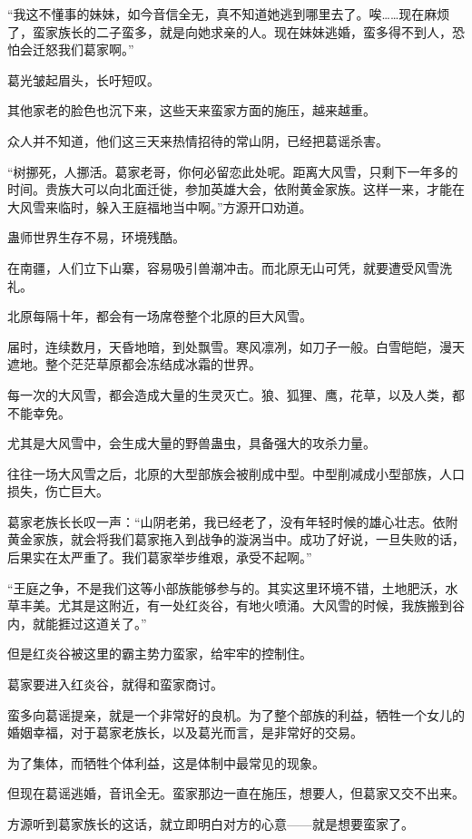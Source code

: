 \begin{this_body}
“我这不懂事的妹妹，如今音信全无，真不知道她逃到哪里去了。唉……现在麻烦了，蛮家族长的二子蛮多，就是向她求亲的人。现在妹妹逃婚，蛮多得不到人，恐怕会迁怒我们葛家啊。”

葛光皱起眉头，长吁短叹。

其他家老的脸色也沉下来，这些天来蛮家方面的施压，越来越重。

众人并不知道，他们这三天来热情招待的常山阴，已经把葛谣杀害。

“树挪死，人挪活。葛家老哥，你何必留恋此处呢。距离大风雪，只剩下一年多的时间。贵族大可以向北面迁徙，参加英雄大会，依附黄金家族。这样一来，才能在大风雪来临时，躲入王庭福地当中啊。”方源开口劝道。

蛊师世界生存不易，环境残酷。

在南疆，人们立下山寨，容易吸引兽潮冲击。而北原无山可凭，就要遭受风雪洗礼。

北原每隔十年，都会有一场席卷整个北原的巨大风雪。

届时，连续数月，天昏地暗，到处飘雪。寒风凛冽，如刀子一般。白雪皑皑，漫天遮地。整个茫茫草原都会冻结成冰霜的世界。

每一次的大风雪，都会造成大量的生灵灭亡。狼、狐狸、鹰，花草，以及人类，都不能幸免。

尤其是大风雪中，会生成大量的野兽蛊虫，具备强大的攻杀力量。

往往一场大风雪之后，北原的大型部族会被削成中型。中型削减成小型部族，人口损失，伤亡巨大。

葛家老族长长叹一声：“山阴老弟，我已经老了，没有年轻时候的雄心壮志。依附黄金家族，就会将我们葛家拖入到战争的漩涡当中。成功了好说，一旦失败的话，后果实在太严重了。我们葛家举步维艰，承受不起啊。”

“王庭之争，不是我们这等小部族能够参与的。其实这里环境不错，土地肥沃，水草丰美。尤其是这附近，有一处红炎谷，有地火喷涌。大风雪的时候，我族搬到谷内，就能捱过这道关了。”

但是红炎谷被这里的霸主势力蛮家，给牢牢的控制住。

葛家要进入红炎谷，就得和蛮家商讨。

蛮多向葛谣提亲，就是一个非常好的良机。为了整个部族的利益，牺牲一个女儿的婚姻幸福，对于葛家老族长，以及葛光而言，是非常好的交易。

为了集体，而牺牲个体利益，这是体制中最常见的现象。

但现在葛谣逃婚，音讯全无。蛮家那边一直在施压，想要人，但葛家又交不出来。

方源听到葛家族长的这话，就立即明白对方的心意——就是想要蛮家了。


\end{this_body}
